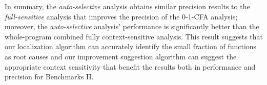 In summary, the {\it auto-selective} analysis obtains similar precision results to the {\it full-sensitive} analysis that improves the precision of the 0-1-CFA analysis; moreover, the {\it auto-selective} analysis' performance is significantly better than the whole-program combined fully context-sensitive analysis. This result suggests that our localization algorithm can accurately identify the small fraction of functions as root causes and our improvement suggestion algorithm can suggest the appropriate context sensitivity that benefit the results both in performance and precision for Benchmarks II.


